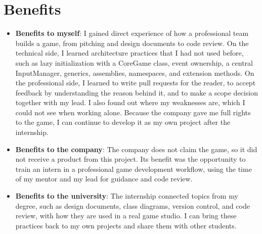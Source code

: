\section{Benefits}
\begin{itemize}[label=-]
    \item \textbf{Benefits to myself}: I gained direct experience of how a professional team builds a game, from pitching and design documents to code review. On the technical side, I learned architecture practices that I had not used before, such as lazy initialization with a CoreGame class, event ownership, a central InputManager, generics, assemblies, namespaces, and extension methods. On the professional side, I learned to write pull requests for the reader, to accept feedback by understanding the reason behind it, and to make a scope decision together with my lead. I also found out where my weaknesses are, which I could not see when working alone. Because the company gave me full rights to the game, I can continue to develop it as my own project after the internship.
    \item \textbf{Benefits to the company}: The company does not claim the game, so it did not receive a product from this project. Its benefit was the opportunity to train an intern in a professional game development workflow, using the time of my mentor and my lead for guidance and code review.
    \item \textbf{Benefits to the university}: The internship connected topics from my degree, such as design documents, class diagrams, version control, and code review, with how they are used in a real game studio. I can bring these practices back to my own projects and share them with other students.
\end{itemize}

\pagebreak
